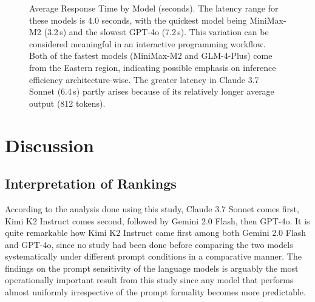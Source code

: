 \documentclass[conference]{IEEEtran}
\begin{document}
\begin{figure}[t]
\centering
{}
\caption{Average Response Time by Model (seconds). The latency range for these models is 4.0 seconds, with the quickest model being MiniMax-M2 (3.2\,s) and the slowest GPT-4o (7.2\,s). This variation can be considered meaningful in an interactive programming workflow. Both of the fastest models (MiniMax-M2 and GLM-4-Plus) come from the Eastern region, indicating possible emphasis on inference efficiency architecture-wise. The greater latency in Claude 3.7 Sonnet (6.4\,s) partly arises because of its relatively longer average output (812 tokens).}
\label{fig:latency}
\end{figure}

\section{Discussion}
\label{sec:discussion}

\subsection{Interpretation of Rankings}

According to the analysis done using this study, Claude 3.7 Sonnet comes first, Kimi K2 Instruct comes second, followed by Gemini 2.0 Flash, then GPT-4o. It is quite remarkable how Kimi K2 Instruct came first among both Gemini 2.0 Flash and GPT-4o, since no study had been done before comparing the two models systematically under different prompt conditions in a comparative manner. The findings on the prompt sensitivity of the language models is arguably the most operationally important result from this study since any model that performs almost uniformly irrespective of the prompt formality becomes more predictable.
\end{document}
